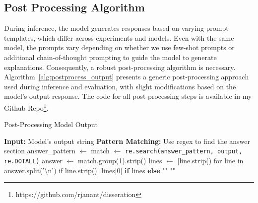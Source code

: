 \documentclass[logo,msc]{infthesis}           %
\begin{document}
\subsection{Post Processing Algorithm}

During inference, the model generates responses based on varying prompt templates, which differ across experiments and models. Even with the same model, the prompts vary depending on whether we use few-shot prompts or additional chain-of-thought prompting to guide the model to generate explanations. Consequently, a robust post-processing algorithm is necessary. Algorithm~\ref{alg:postprocess_output} presents a generic post-processing approach used during inference and evaluation, with slight modifications based on the model's output response. The code for all post-processing steps is available in my Github Repo\footnote{https://github.com/rjanant/disseration}.
\begin{algorithm}
\caption{Post-Processing Model Output}
\label{alg:postprocess_output}
\begin{algorithmic}[1]
    \State \textbf{Input:} Model's output string
    \State \textbf{Pattern Matching:} Use regex to find the answer section
    \State answer\_pattern $\gets$ 
    \State {}
    \State {}
    \State match $\gets$ \texttt{re.search(answer\_pattern, output, re.DOTALL)}
        \State answer $\gets$ match.group(1).strip()
        \State lines $\gets$ [line.strip() for line in answer.split('\textbackslash n') if line.strip()]
        \State \Return lines[0] \textbf{if} lines \textbf{else} ""
    \Else
        \State \Return ""
    \EndIf
\EndFunction
\end{algorithmic}
\end{algorithm}
\end{document}
